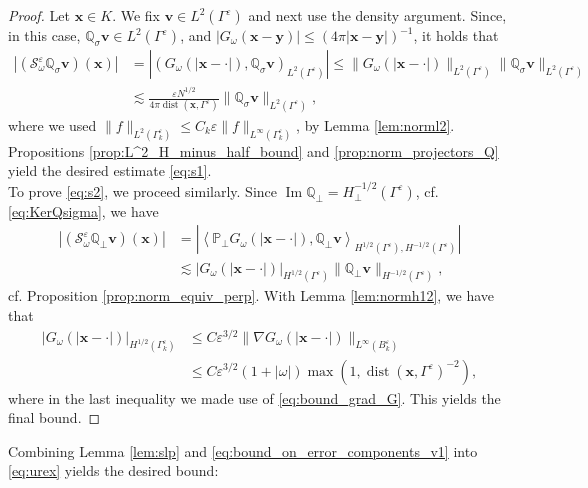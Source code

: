 \documentclass[]{article}
\numberwithin{equation}{section}
\numberwithin{theorem}{section}
\numberwithin{lemma}{section}
\numberwithin{corollary}{section}
\numberwithin{proposition}{section}
\numberwithin{definition}{section}
\newcommand{\bx}{\boldsymbol{x}}
\newcommand{\re}{\varepsilon}
\renewcommand{\vec}{\boldsymbol}
\renewcommand{\Im}{\operatorname{Im}}
\begin{document}
	\begin{proof}
		Let $\bx\in K$. We fix $\vec{v}\in L^2(\Gamma^{\re})$ and next use the density argument. Since, in this case,  $\mathbb{Q}_{\sigma}\vec{v}\in L^2(\Gamma^{\re})$, and $|G_{\omega}(\vec{x}-\vec{y})|\leq (4\pi | \vec{x}-\vec{y} |)^{-1}$, it holds that 
		\begin{align*}%
			\left|	(\mathcal{S}^{\re}_{\omega}\mathbb{Q}_{\sigma}\vec{v})(\vec{x})\right|&=\left|(G_{\omega}(|\bx - \cdot|), \mathbb{Q}_{\sigma}\vec{v})_{L^2(\Gamma^{\re})}\right|  \leq \| G_{\omega} (|\bx - \cdot|) \|_{L^2(\Gamma^{\re})} \| \mathbb{Q}_{\sigma} \vec{v} \|_{L^2(\Gamma^{\re})} \\&\lesssim\frac{\re N^{1/2} }{4\pi\operatorname{dist}(\vec{x},\Gamma^{\re})}\|\mathbb{Q}_{\sigma}\vec{v}\|_{L^2(\Gamma^{\re})}
			,
		\end{align*}
		where we used $\|f\|_{L^2(\Gamma^{\re}_k)}\leq C_k \re \|f\|_{L^{\infty}(\Gamma^{\re}_k)}$, by Lemma \ref{lem:norml2}. Propositions \ref{prop:L^2_H_minus_half_bound} and  \ref{prop:norm_projectors_Q} yield the desired estimate \eqref{eq:s1}. \\
		To prove \eqref{eq:s2}, we proceed similarly. Since $\Im \mathbb{Q}_{\perp}=H^{-1/2}_{\perp}(\Gamma^{\re})$, cf. \eqref{eq:KerQsigma}, we have
		\begin{align*}%
			\left| (\mathcal{S}^{\re}_{\omega}\mathbb{Q}_{\perp}\vec{v})(\vec{x}) \right|
			&= \left|  \left\langle \mathbb{P}_{\perp} G_{\omega}(|\vec{x} - \cdot|), \mathbb{Q}_{\perp}\vec{v} \right\rangle_{H^{1/2}(\Gamma^{\re}), H^{-1/2}(\Gamma^{\re})} \right|
			\\&\lesssim |G_{\omega}(|\vec{x} - \cdot|)|_{H^{1/2}(\Gamma^{\re})}\|\mathbb{Q}_{\perp}\vec{v}\|_{H^{-1/2}(\Gamma^{\re})}, 
		\end{align*}
		cf. Proposition \ref{prop:norm_equiv_perp}.  
		With Lemma \ref{lem:normh12}, we have that
		\begin{align*}%
			|G_{\omega}(|\vec{x} - \cdot|)|_{H^{1/2}(\Gamma^{\re}_k)} &\leq C \varepsilon^{3/2}\|\nabla G_{\omega}(|\vec{x}-\cdot|)\|_{L^{\infty}(B^{\re}_k)} \\ 
			&\leq C\re^{3/2}(1+|\omega|)\max(1, \operatorname{dist}(\vec{x},\Gamma^{\re})^{-2}),
		\end{align*}
		where in the last inequality we made use of \eqref{eq:bound_grad_G}.
		This yields the final bound.
	\end{proof}
	Combining Lemma \ref{lem:slp} and \eqref{eq:bound_on_error_components_v1} into \eqref{eq:urex} yields the desired bound:
\end{document}
